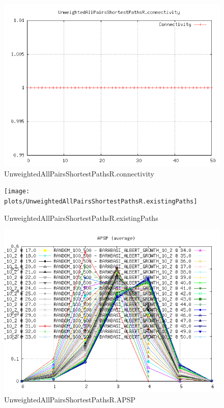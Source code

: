 \begin{figure} [h]
	\centering
	\includegraphics [scale=0.8] {plots/UnweightedAllPairsShortestPathsR.connectivity}
	\caption{UnweightedAllPairsShortestPathsR.connectivity}
	\label{plot:RANDOM_100_500 - BARABASI_ALBERT_GROWTH_10_2.UnweightedAllPairsShortestPathsR.connectivity}
\end{figure}

\begin{figure} [h]
	\centering
	\texttt{[image: plots/UnweightedAllPairsShortestPathsR.existingPaths]}
	\caption{UnweightedAllPairsShortestPathsR.existingPaths}
	\label{plot:RANDOM_100_500 - BARABASI_ALBERT_GROWTH_10_2.UnweightedAllPairsShortestPathsR.existingPaths}
\end{figure}

\begin{figure} [h]
	\centering
	\includegraphics [scale=0.8] {plots/UnweightedAllPairsShortestPathsR.APSP}
	\caption{UnweightedAllPairsShortestPathsR.APSP}
	\label{plot:RANDOM_100_500 - BARABASI_ALBERT_GROWTH_10_2.UnweightedAllPairsShortestPathsR.APSP}
\end{figure}

